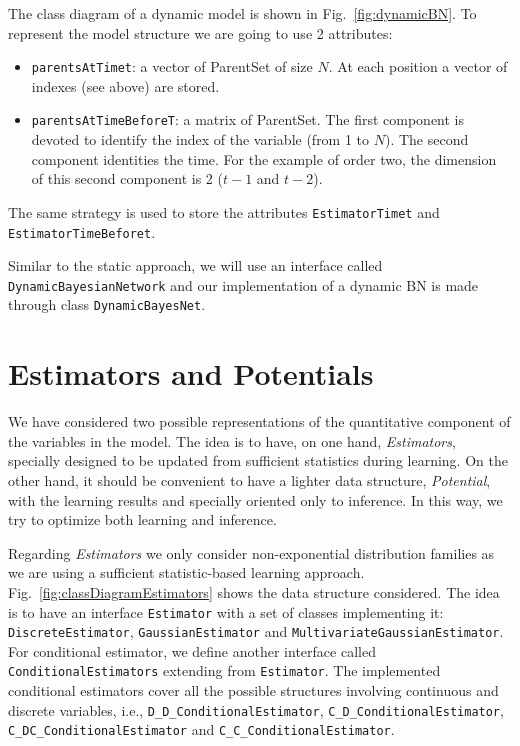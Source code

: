 \documentclass[a4paper,12pt]{article}
\begin{document}
The class diagram of a dynamic model is shown in Fig.~\ref{fig:dynamicBN}. 
To represent the model structure we are going to use 2 attributes: 

\begin{itemize}
\item \texttt{parentsAtTimet}: a vector of ParentSet of size $N$. At each position a vector of indexes (see above) are stored. 
\item \texttt{parentsAtTimeBeforeT}: a matrix of ParentSet. The first component is devoted to identify the index of the variable (from 1 to $N$).
The second component identities the time. For the example of order two, the dimension of this second component is 2 ($t-1$ and $t-2$).
\end{itemize}

The same strategy is used to store the attributes \texttt{EstimatorTimet} and \texttt{EstimatorTimeBeforet}.

Similar to the static approach, we will use an interface called 
\texttt{DynamicBayesianNetwork} and our implementation of a dynamic BN
is made through class \texttt{DynamicBayesNet}. 



\section{Estimators and Potentials}
\label{sec:estimator_potential}

We have considered two possible representations of the quantitative component of the 
variables in the model. The idea is to have, on one hand, \emph{Estimators}, specially 
designed to be updated from sufficient statistics during learning.
On the other hand, it should be convenient to have a lighter data structure, 
\emph{Potential}, with the learning results and specially oriented only to inference. 
In this way, we try to optimize both learning and inference. 

Regarding \emph{Estimators} we only consider non-exponential distribution families as
we are using a sufficient statistic-based learning approach. Fig.~\ref{fig:classDiagramEstimators}
shows the data structure considered. The idea is to have an interface \texttt{Estimator} with a set 
of classes implementing it: \texttt{DiscreteEstimator}, \texttt{GaussianEstimator} and \texttt{MultivariateGaussianEstimator}.
For conditional estimator, we define another interface called \texttt{ConditionalEstimators} extending from \texttt{Estimator}.
The implemented conditional estimators cover all the possible structures involving continuous and discrete variables, i.e., 
\texttt{D\_D\_ConditionalEstimator}, \texttt{C\_D\_ConditionalEstimator}, \texttt{C\_DC\_ConditionalEstimator} and \texttt{C\_C\_ConditionalEstimator}.
\end{document}
